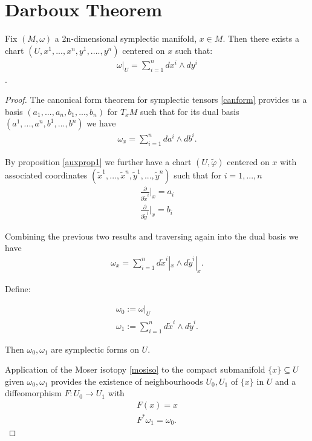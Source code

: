 \section{Darboux Theorem}

\begin{theorem} \cite{lee1}
Fix $(M , \omega)$ a 2n-dimensional symplectic manifold, $x \in M$. Then there exists a chart $(U, x^1, ... , x^n, y^1, .... , y^n)$ centered on $x$ such that:
\begin{align*}
\omega |_U = \sum^n_{i=1} dx^i \wedge dy^i
\end{align*}.
\end{theorem}

\begin{proof}
The canonical form theorem for symplectic tensors \ref{canform} provides us a basis $(a_1, ... , a_n, b_1, ... , b_n)$ for $T_x M$ such that for its dual basis $(a^1, ... , a^n, b^1, ... , b^n)$ we have
\begin{align*}
\omega_x = \sum^n_{i=1} da^i \wedge db^i.
\end{align*}

By proposition \ref{auxprop1} we further have a chart $(U, \tilde{\varphi})$ centered on $x$ with associated coordinates $({\tilde{x}}^1, ... , {\tilde{x}}^n ,{\tilde{y}}^1, ... , {\tilde{y}}^n)$ such that for $i = 1,..., n$
\begin{align*}
\frac{\partial}{\partial \tilde{x}^i} \bigg\vert_x = a_i  \\
\frac{\partial}{\partial \tilde{y}^i} \bigg\vert_x = b_i 
\end{align*}

Combining the previous two results and traversing again into the dual basis we have
\begin{align*}
\omega_x = \sum^n_{i=1} d\tilde{x}^i|_x \wedge d\tilde{y}^i|_x.
\end{align*}

Define:

\begin{align*}
\omega_0 := \omega|_U \\
\omega_1 := \sum^n_{i=1} d\tilde{x}^i \wedge d\tilde{y}^i.
\end{align*}

Then $\omega_0 , \omega_1$ are symplectic forms on $U$. 

Application of the Moser isotopy \ref{mosiso} to the compact submanifold $\{x\} \subseteq U$ given $\omega_0, \omega_1$ provides the existence of neighbourhoods $U_0, U_1$ of $\{x\}$ in $U$ and a diffeomorphism $F: U_0 \to U_1$ with
\begin{align*}
F(x) = x \\
F^* \omega_1 = \omega_0.
\end{align*}


\end{proof}
